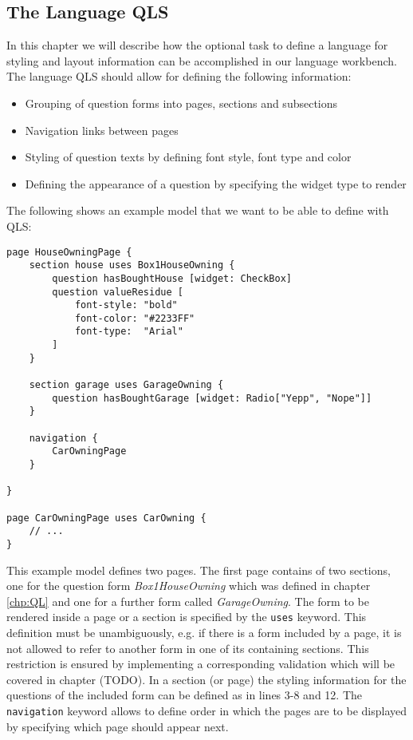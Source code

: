 \subsection{The Language QLS}

In this chapter we will describe how the optional task to define a language 
for styling and layout information can be accomplished in our language workbench.
The language QLS should allow for defining the following information:
\begin{itemize}
  \item Grouping of question forms into pages, sections and subsections
  \item Navigation links between pages
  \item Styling of question texts by defining font style, font type and color
  \item Defining the appearance of a question by specifying the widget type to render
\end{itemize}

The following shows an example model that we want to be able to define with QLS:

\begin{lstlisting}[language=QLS]
page HouseOwningPage {
	section house uses Box1HouseOwning {
		question hasBoughtHouse [widget: CheckBox]
		question valueResidue [
			font-style: "bold" 
			font-color: "#2233FF"
			font-type:  "Arial"
		]
	}
	
	section garage uses GarageOwning {
		question hasBoughtGarage [widget: Radio["Yepp", "Nope"]]		
	}
	
	navigation {
		CarOwningPage
	}
	
}

page CarOwningPage uses CarOwning {
	// ...
}
\end{lstlisting}

This example model defines two pages. The first page contains of two sections,
one for the question form \emph{Box1HouseOwning} which was defined in chapter 
\ref{chp:QL} and one for a further form called \emph{GarageOwning}. The form to
be rendered inside a page or a section is specified by the \texttt{uses} keyword.
This definition must be unambiguously, e.g. if there is a form included by a page,
it is not allowed to refer to another form in one of its containing sections.
This restriction is ensured by implementing a corresponding validation which will be covered
in chapter (TODO). In a section (or page) the styling information for the questions of the included
form can be defined as in lines 3-8 and 12. The \texttt{navigation} keyword allows to define order in which the pages are to
be displayed by specifying which page should appear next.

